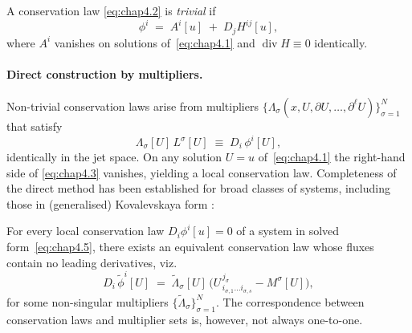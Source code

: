 \documentclass[alpha-refs, 12pt]{wiley-article}
\begin{document}
A conservation law \eqref{eq:chap4.2} is \emph{trivial} if
\[
  \phi^{i}\;=\;A^{i}[u]\;+\;D_{j}H^{ij}[u],
\]
where $A^{i}$ vanishes on solutions of~\eqref{eq:chap4.1} and $\operatorname{div}H \equiv 0$ identically.

\paragraph{Direct construction by multipliers.} Non-trivial conservation laws arise from multipliers
$\{\Lambda_{\sigma}(x,U,\partial U,\dots,\partial^{\ell}U)\}_{\sigma=1}^{N}$ that satisfy
\begin{equation}\label{eq:chap4.3}
  \Lambda_{\sigma}[U]\,L^{\sigma}[U]
  \;\equiv\;
  D_{i}\,\phi^{i}[U],
\end{equation}
identically in the jet space. On any solution $U=u$ of~\eqref{eq:chap4.1} the right-hand side of \eqref{eq:chap4.3} vanishes, yielding a local conservation law. Completeness of the direct method has been established for broad classes of systems, including those in (generalised) Kovalevskaya form \cite{Olver1993}:
\begin{theorem}\label{thm:char_form}
  For every local conservation law $D_{i}\phi^{i}[u]=0$ of a system in solved form~\eqref{eq:chap4.5}, there exists an equivalent conservation law whose fluxes contain no leading derivatives, viz.
  \[
      D_{i}\,\tilde{\phi}^{i}[U]
      \;=\;
      \widetilde{\Lambda}_{\sigma}[U]\,
      \bigl(
          U^{\,j_{\sigma}}_{\,i_{\sigma,1}\dots i_{\sigma,s}}
          -M^{\sigma}[U]
      \bigr),
  \]
  for some non-singular multipliers $\{\widetilde{\Lambda}_{\sigma}\}_{\sigma=1}^{N}$. The correspondence between conservation laws and multiplier sets is, however, not always one-to-one.
\end{theorem}
\end{document}
